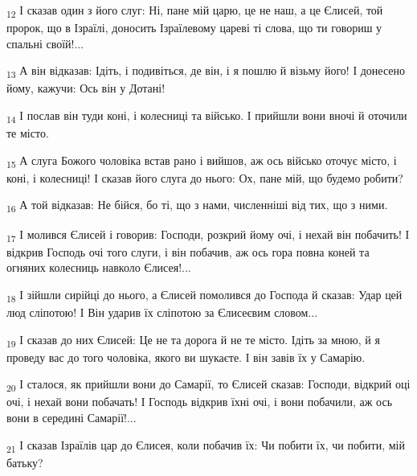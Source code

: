 \begin{tcolorbox}
\textsubscript{12} І сказав один з його слуг: Ні, пане мій царю, це не наш, а це Єлисей, той пророк, що в Ізраїлі, доносить Ізраїлевому цареві ті слова, що ти говориш у спальні своїй!...
\end{tcolorbox}
\begin{tcolorbox}
\textsubscript{13} А він відказав: Ідіть, і подивіться, де він, і я пошлю й візьму його! І донесено йому, кажучи: Ось він у Дотані!
\end{tcolorbox}
\begin{tcolorbox}
\textsubscript{14} І послав він туди коні, і колесниці та військо. І прийшли вони вночі й оточили те місто.
\end{tcolorbox}
\begin{tcolorbox}
\textsubscript{15} А слуга Божого чоловіка встав рано і вийшов, аж ось військо оточує місто, і коні, і колесниці! І сказав його слуга до нього: Ох, пане мій, що будемо робити?
\end{tcolorbox}
\begin{tcolorbox}
\textsubscript{16} А той відказав: Не бійся, бо ті, що з нами, численніші від тих, що з ними.
\end{tcolorbox}
\begin{tcolorbox}
\textsubscript{17} І молився Єлисей і говорив: Господи, розкрий йому очі, і нехай він побачить! І відкрив Господь очі того слуги, і він побачив, аж ось гора повна коней та огняних колесниць навколо Єлисея!...
\end{tcolorbox}
\begin{tcolorbox}
\textsubscript{18} І зійшли сирійці до нього, а Єлисей помолився до Господа й сказав: Удар цей люд сліпотою! І Він ударив їх сліпотою за Єлисеєвим словом...
\end{tcolorbox}
\begin{tcolorbox}
\textsubscript{19} І сказав до них Єлисей: Це не та дорога й не те місто. Ідіть за мною, й я проведу вас до того чоловіка, якого ви шукаєте. І він завів їх у Самарію.
\end{tcolorbox}
\begin{tcolorbox}
\textsubscript{20} І сталося, як прийшли вони до Самарії, то Єлисей сказав: Господи, відкрий оці очі, і нехай вони побачать! І Господь відкрив їхні очі, і вони побачили, аж ось вони в середині Самарії!...
\end{tcolorbox}
\begin{tcolorbox}
\textsubscript{21} І сказав Ізраїлів цар до Єлисея, коли побачив їх: Чи побити їх, чи побити, мій батьку?
\end{tcolorbox}
